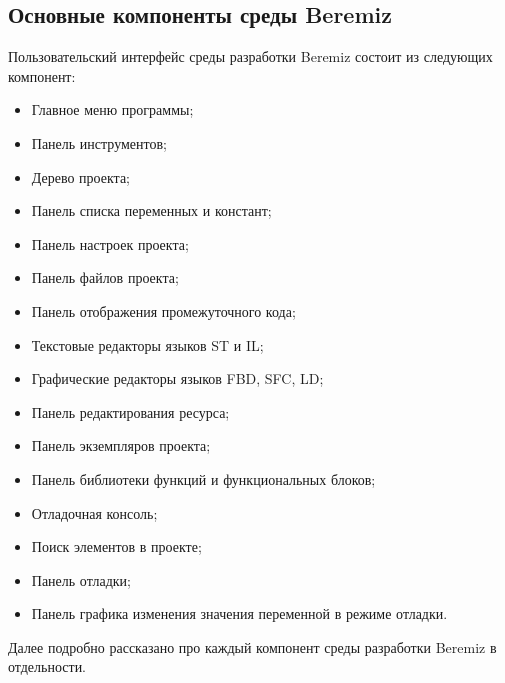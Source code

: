 \documentclass[letterpaper,10pt,russian]{sphinxmanual}
\begin{document}
\subsection{Основные компоненты среды Beremiz}
\label{usage_guide/ide_components:beremiz}\label{usage_guide/ide_components::doc}
Пользовательский интерфейс среды разработки Beremiz состоит из следующих
компонент:
\begin{itemize}
\item {} 
Главное меню программы;

\item {} 
Панель инструментов;

\item {} 
Дерево проекта;

\item {} 
Панель списка переменных и констант;

\item {} 
Панель настроек проекта;

\item {} 
Панель файлов проекта;

\item {} 
Панель отображения промежуточного кода;

\item {} 
Текстовые редакторы языков ST и IL;

\item {} 
Графические редакторы языков FBD, SFC, LD;

\item {} 
Панель редактирования ресурса;

\item {} 
Панель экземпляров проекта;

\item {} 
Панель библиотеки функций и функциональных блоков;

\item {} 
Отладочная консоль;

\item {} 
Поиск элементов в проекте;

\item {} 
Панель отладки;

\item {} 
Панель графика изменения значения переменной в режиме отладки.

\end{itemize}

Далее подробно рассказано про каждый компонент среды разработки Beremiz
в отдельности.
\end{document}
